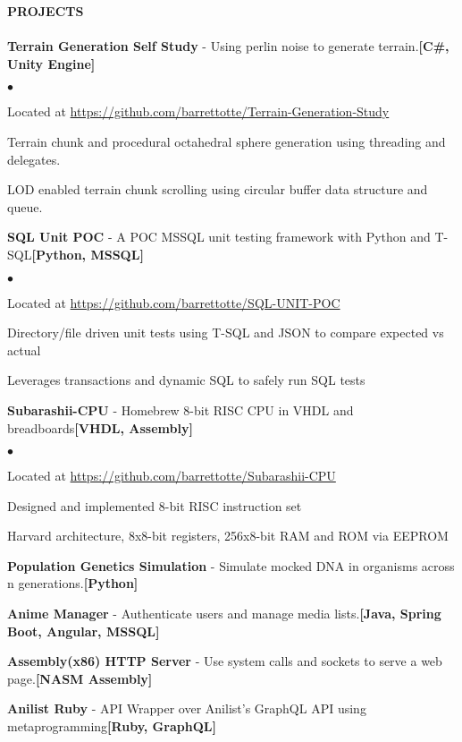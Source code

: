 \documentclass{article}
\newcommand{\lineunder}{
	\vspace*{-4pt}\\ 
	\hspace*{-18pt}\hrulefill \\
}
\newcommand{\header}[1]{
	{\hspace*{-15pt}\vspace*{6pt}\textsc{#1}}\vspace*{-6pt}\lineunder
}
\newcommand{\project}[3]{
	{\textbf{#1} - #2{\hfill\textbf{#3}}\vspace*{3pt}}
}
\newenvironment{resumecontent}{
	\begin{list}
		{\small$\bullet$}{\topsep 0pt \itemsep -2pt}}{\vspace*{4pt}
	\end{list}
}
\newcommand{\resumeheader}[1]{
	\vspace*{5pt}
	\header{\textbf{#1}}
}
\begin{document}
	\resumeheader{PROJECTS}
		\project
			{Terrain Generation Self Study}
			{Using perlin noise to generate terrain.}
			{[C\#, Unity Engine]}
			\begin{resumecontent}
				\item Located at \href{https://github.com/barrettotte/Terrain-Generation-Study}
					{https://github.com/barrettotte/Terrain-Generation-Study}
				\item Terrain chunk and procedural octahedral sphere generation using threading and delegates.
				\item LOD enabled terrain chunk scrolling using circular buffer data structure and queue. 
			\end{resumecontent}
		\project
			{SQL Unit POC}
			{A POC MSSQL unit testing framework with Python and T-SQL} 
			{[Python, MSSQL]}
			\begin{resumecontent}
				\item Located at \href{https://github.com/barrettotte/SQL-UNIT-POC}
					{https://github.com/barrettotte/SQL-UNIT-POC}
				\item Directory/file driven unit tests using T-SQL and JSON to compare expected vs actual
				\item Leverages transactions and dynamic SQL to safely run SQL tests
			\end{resumecontent}
		\project
			{Subarashii-CPU}
			{Homebrew 8-bit RISC CPU in VHDL and breadboards} 
			{[VHDL, Assembly]}
			\begin{resumecontent}
				\item Located at \href{https://github.com/barrettotte/Subarashii-CPU}
					{https://github.com/barrettotte/Subarashii-CPU}
				\item Designed and implemented 8-bit RISC instruction set
				\item Harvard architecture, 8x8-bit registers, 256x8-bit RAM and ROM via EEPROM
			\end{resumecontent}
		\project
			{Population Genetics Simulation}
			{Simulate mocked DNA in organisms across n generations.}
			{[Python]}
		\project
			{Anime Manager}
			{Authenticate users and manage media lists.}
			{[Java, Spring Boot, Angular, MSSQL]}
		\project
			{Assembly(x86) HTTP Server}
			{Use system calls and sockets to serve a web page.}
			{[NASM Assembly]}
		\project
			{Anilist Ruby}
			{API Wrapper over Anilist's GraphQL API using metaprogramming}
			{[Ruby, GraphQL]}
\end{document}
